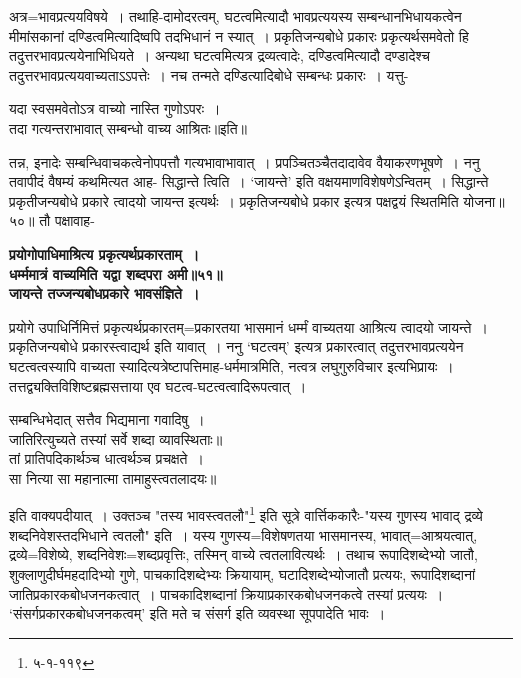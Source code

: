 {{{{ अत्र=भावप्रत्ययविषये~।
तथाहि-दामोदरत्वम्, घटत्वमित्यादौ भावप्रत्ययस्य सम्बन्धानभिधायकत्वेन मीमांसकानां दण्डित्वमित्यादिष्वपि तदभिधानं न स्यात्~।
प्रकृतिजन्यबोधे प्रकारः प्रकृत्यर्थसमवेतो हि तदुत्तरभावप्रत्ययेनाभिधियते~।
अन्यथा घटत्वमित्यत्र द्रव्यत्वादेः, दण्डित्वमित्यादौ दण्डादेश्च तदुत्तरभावप्रत्ययवाच्यताऽऽपत्तेः~।
नच तन्मते दण्डित्यादिबोधे सम्बन्धः प्रकारः~।
 यत्तु-
 \begin{center}यदा स्वसमवेतोऽत्र वाच्यो नास्ति गुणोऽपरः~।\\
 तदा गत्यन्तराभावात् सम्बन्धो वाच्य आश्रितः॥इति॥\end{center}
 तन्न, इनादेः सम्बन्धिवाचकत्वेनोपपत्तौ गत्यभावाभावात्~।
प्रपञ्चितञ्चैतदादावेव वैयाकरणभूषणे~।
 ननु तवापीदं वैषम्यं कथमित्यत आह- सिद्धान्ते त्विति~।
`जायन्ते' इति वक्षयमाणविशेषणेऽन्वितम्~।
सिद्धान्ते प्रकृतीजन्यबोधे प्रकारे त्वादयो जायन्त इत्यर्थः~।
 प्रकृतिजन्यबोधे प्रकार इत्यत्र पक्षद्वयं स्थितमिति योजना॥५०॥
तौ पक्षावाह-
\begin{center}{\bfseries प्रयोगोपाधिमाश्रित्य प्रकृत्यर्थप्रकारताम्~।\\
 धर्म्ममात्रं वाच्यमिति यद्वा शब्दपरा अमी॥५१॥\\[10pt]
 जायन्ते तज्जन्यबोधप्रकारे भावसंज्ञिते~।}\end{center}
 प्रयोगे उपाधिर्निमित्तं प्रकृत्यर्थप्रकारतम्=प्रकारतया भासमानं धर्म्मं वाच्यतया आश्रित्य त्वादयो जायन्ते~।
प्रकृतिजन्यबोधे प्रकारस्त्वाद्यर्थ इति यावात्~।
 ननु `घटत्वम्' इत्यत्र प्रकारत्वात् तदुत्तरभावप्रत्ययेन घटत्वत्वस्यापि वाच्यता स्यादित्यत्रेष्टापत्तिमाह-धर्ममात्रमिति, नत्वत्र लघुगुरुविचार इत्यभिप्रायः~।
तत्तद्व्यक्तिविशिष्टब्रह्मसत्ताया एव घटत्व-घटत्वत्वादिरूपत्वात्~।
\begin{center} सम्बन्धिभेदात् सत्तैव भिद्यमाना गवादिषु~।\\
 जातिरित्युच्यते तस्यां सर्वे शब्दा व्यावस्थिताः॥\\[10pt]
 तां प्रातिपदिकार्थञ्च धात्वर्थञ्च प्रचक्षते~।\\
 सा नित्या सा महानात्मा तामाहुस्त्वतलादयः॥\end{center}
 इति वाक्यपदीयात्~।
उक्तञ्च "तस्य भावस्त्वतलौ"\footnote{५-१-११९} इति सूत्रे वार्त्तिककारैः-"यस्य गुणस्य भावाद् द्रव्ये शब्दनिवेशस्तदभिधाने त्वतलौ" इति~।
 यस्य गुणस्य=विशेषणतया भासमानस्य, भावात्=आश्रयत्वात्, द्रव्ये=विशेष्ये, शब्दनिवेशः=शब्दप्रवृत्तिः, तस्मिन् वाच्ये त्वतलावित्यर्थः~।
तथाच रूपादिशब्देभ्यो जातौ, शुक्लाणुदीर्घमहदादिभ्यो गुणे, पाचकादिशब्देभ्यः क्रियायाम्, घटादिशब्देभ्योजातौ प्रत्ययः, रूपादिशब्दानां जातिप्रकारकबोधजनकत्वात्~।
पाचकादिशब्दानां क्रियाप्रकारकबोधजनकत्वे तस्यां प्रत्ययः~।
 `संसर्गप्रकारकबोधजनकत्वम्' इति मते च संसर्ग इति व्यवस्था सूपपादेति भावः~।
}}}}
